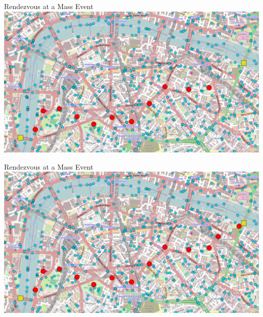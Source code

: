 \documentclass[presentation]{beamer} %
\begin{document}
\begin{frame}{Rendezvous at a Mass Event}
  \centering
  \includegraphics[width=\textwidth{}]{imgs/screenshots/london5}
\end{frame}

\begin{frame}{Rendezvous at a Mass Event}
  \centering
  \includegraphics[width=\textwidth{}]{imgs/screenshots/london6}
\end{frame}
\end{document}
